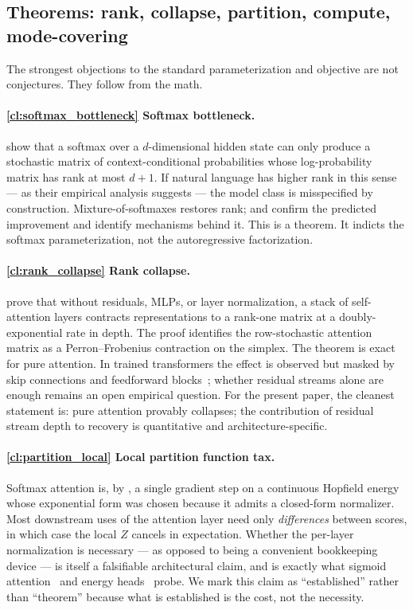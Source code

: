 \subsection{Theorems: rank, collapse, partition, compute, mode-covering}
\label{ssec:theorems}

The strongest objections to the standard parameterization and objective are not conjectures.
They follow from the math.

\paragraph{\ref{cl:softmax_bottleneck} Softmax bottleneck.}
\citet{yang2018softmax} show that a softmax over a $d$-dimensional hidden state can only produce a stochastic matrix of context-conditional probabilities whose log-probability matrix has rank at most $d+1$.
If natural language has higher rank in this sense --- as their empirical analysis suggests --- the model class is misspecified by construction.
Mixture-of-softmaxes restores rank;
\citet{kanai2018mixture} and \citet{chang2022softmax} confirm the predicted improvement and identify mechanisms behind it.
This is a theorem.
It indicts the softmax parameterization, not the autoregressive factorization.

\paragraph{\ref{cl:rank_collapse} Rank collapse.}
\citet{dong2021attention} prove that without residuals, MLPs, or layer normalization, a stack of self-attention layers contracts representations to a rank-one matrix at a doubly-exponential rate in depth.
The proof identifies the row-stochastic attention matrix as a Perron--Frobenius contraction on the simplex.
The theorem is exact for pure attention.
In trained transformers the effect is observed but masked by skip connections and feedforward blocks~\citep{noci2022signal,he2023deep};
whether residual streams alone are enough remains an open empirical question.
For the present paper, the cleanest statement is: pure attention provably collapses;
the contribution of residual stream depth to recovery is quantitative and architecture-specific.

\paragraph{\ref{cl:partition_local} Local partition function tax.}
Softmax attention is, by \citet{ramsauer2020hopfield}, a single gradient step on a continuous Hopfield energy whose exponential form was chosen because it admits a closed-form normalizer.
Most downstream uses of the attention layer need only \emph{differences} between scores, in which case the local $Z$ cancels in expectation.
Whether the per-layer normalization is necessary --- as opposed to being a convenient bookkeeping device --- is itself a falsifiable architectural claim, and is exactly what sigmoid attention~\citep{wortsman2023sigmoid,ramapuram2024theory} and energy heads~\citep{grathwohl2019your} probe.
We mark this claim as ``established'' rather than ``theorem'' because what is established is the cost, not the necessity.

